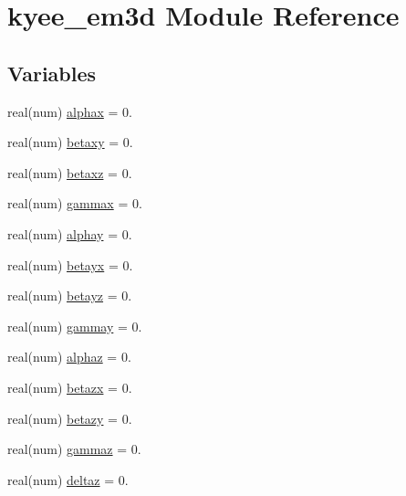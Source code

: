 \hypertarget{namespacekyee__em3d}{}\section{kyee\+\_\+em3d Module Reference}
\label{namespacekyee__em3d}
\subsection*{Variables}
\begin{DoxyCompactItemize}
\item 
real(num) \hyperlink{namespacekyee__em3d_ac2a66c5c8d30bf6b7b48aea0657bf8bc}{alphax} = 0.
\item 
real(num) \hyperlink{namespacekyee__em3d_ae8a174dcda1cd460d69a96037af08fd2}{betaxy} = 0.
\item 
real(num) \hyperlink{namespacekyee__em3d_a1e5f96f2e02b45f24c52684bf13384b8}{betaxz} = 0.
\item 
real(num) \hyperlink{namespacekyee__em3d_af730f313af91da666568b7b5c38a6c51}{gammax} = 0.
\item 
real(num) \hyperlink{namespacekyee__em3d_aa2267c9b11a659a0462bfece7c0c2916}{alphay} = 0.
\item 
real(num) \hyperlink{namespacekyee__em3d_ac18e9a9e8cbb4229504331b7f282ac3c}{betayx} = 0.
\item 
real(num) \hyperlink{namespacekyee__em3d_afd94263eb5a367fedefa519ea52b097e}{betayz} = 0.
\item 
real(num) \hyperlink{namespacekyee__em3d_a2abb84b93c833164a253038ccfe8caf2}{gammay} = 0.
\item 
real(num) \hyperlink{namespacekyee__em3d_a47e844c257f4e614390c7ca29cce5f2c}{alphaz} = 0.
\item 
real(num) \hyperlink{namespacekyee__em3d_a35f1386b251e44934007765b790b6952}{betazx} = 0.
\item 
real(num) \hyperlink{namespacekyee__em3d_a3de51162fe948dd8a0de06489d7b20e5}{betazy} = 0.
\item 
real(num) \hyperlink{namespacekyee__em3d_a0a1131129b323f405033e0157a2cff2f}{gammaz} = 0.
\item 
real(num) \hyperlink{namespacekyee__em3d_aaa71d4d9190708dfbc55e561c8fa1712}{deltaz} = 0.
\end{DoxyCompactItemize}


